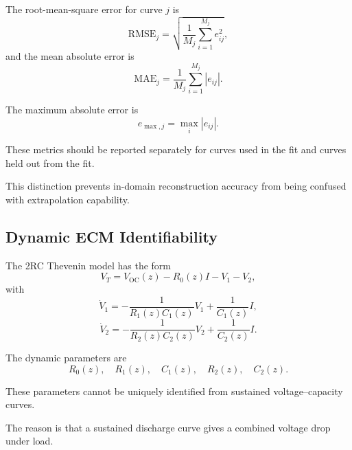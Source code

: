 \documentclass[a4paper,12pt]{article}
\begin{document}
The root-mean-square error for curve \(j\) is
\begin{equation}
\mathrm{RMSE}_j
=
\sqrt{
\frac{1}{M_j}
\sum_{i=1}^{M_j}
e_{ij}^{2}
},
\label{eq:method_rmse_curve}
\end{equation}
and the mean absolute error is
\begin{equation}
\mathrm{MAE}_j
=
\frac{1}{M_j}
\sum_{i=1}^{M_j}
\left|
e_{ij}
\right|.
\label{eq:method_mae_curve}
\end{equation}

The maximum absolute error is
\begin{equation}
e_{\max,j}
=
\max_i
\left|
e_{ij}
\right|.
\label{eq:method_max_error_curve}
\end{equation}

These metrics should be reported separately for curves used in the fit and curves held out from the fit.

This distinction prevents in-domain reconstruction accuracy from being confused with extrapolation capability.

\subsection{Dynamic ECM Identifiability}

The 2RC Thevenin model has the form
\begin{equation}
V_T
=
V_{\mathrm{OC}}(z)
-
R_0(z)I
-
V_1
-
V_2,
\label{eq:method_dynamic_terminal_voltage}
\end{equation}
with
\begin{equation}
\dot{V}_1
=
-\frac{1}{R_1(z)C_1(z)}V_1
+
\frac{1}{C_1(z)}I,
\label{eq:method_dynamic_v1}
\end{equation}
\begin{equation}
\dot{V}_2
=
-\frac{1}{R_2(z)C_2(z)}V_2
+
\frac{1}{C_2(z)}I.
\label{eq:method_dynamic_v2}
\end{equation}

The dynamic parameters are
\begin{equation}
R_0(z),
\quad
R_1(z),
\quad
C_1(z),
\quad
R_2(z),
\quad
C_2(z).
\label{eq:method_dynamic_parameters}
\end{equation}

These parameters cannot be uniquely identified from sustained voltage--capacity curves.

The reason is that a sustained discharge curve gives a combined voltage drop under load.
\end{document}
